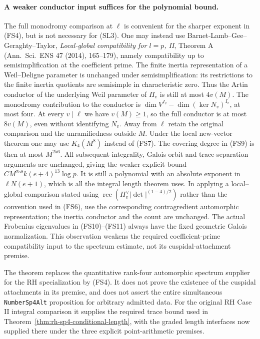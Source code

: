 \paragraph{A weaker conductor input suffices for the polynomial bound.}
The full monodromy comparison at \(\ell\) is convenient for the
sharper exponent in (FS4), but is not necessary for (SL3).
One may instead use Barnet-Lamb--Gee--Geraghty--Taylor,
\emph{Local-global compatibility for \(l=p\), II},
Theorem A (Ann.\ Sci.\ ENS 47 (2014), 165--179), namely
compatibility up to semisimplification at the coefficient prime.
The finite inertia representation of a Weil--Deligne parameter is
unchanged under semisimplification: its restrictions to the finite
inertia quotients are semisimple in characteristic zero.
Thus the Artin conductor of the underlying Weil parameter of
\(\Pi_v\) is still at most \(4v(M)\).
The monodromy contribution to the conductor is
\(\dim V^{I_v}-\dim(\ker N_v)^{I_v}\), at most four.
At every \(v\mid\ell\) we have \(v(M)\ge1\), so the full conductor
is at most \(8v(M)\), even without identifying \(N_v\).
Away from \(\ell\) retain the original comparison and the
unramifiedness outside \(M\). Under the local new-vector theorem
one may use \(K_4(M^8)\) instead of (FS7). The covering degree
in (FS9) is then at most \(M^{256}\). All subsequent integrality,
Galois orbit and trace-separation arguments are unchanged, giving
the weaker explicit bound \(C M^{258}k(e+4)^{13}\log p\).
It is still a polynomial with an absolute exponent in
\(\ell N(e+1)\), which is all the integral length theorem uses.
In applying a local--global comparison stated using
\(\operatorname{rec}(\Pi_v^\vee|\det|^{(1-4)/2})\) rather than
the convention used in (FS6), use the corresponding
contragredient automorphic representation; the inertia conductor
and the count are unchanged. The actual Frobenius eigenvalues
in (FS10)--(FS11) always have the fixed geometric Galois
normalization. This observation weakens the required
coefficient-prime compatibility input to the spectrum estimate,
not its cuspidal-attachment premise.

The theorem replaces the quantitative rank-four automorphic
spectrum supplier for the RH specialization by (FS4). It does
not prove the existence of the cuspidal attachments in its
premise, and does not assert the entire simultaneous
\texttt{NumberSp4Alt} proposition for arbitrary admitted data.
For the original RH Case II integral comparison it supplies
the required trace bound used in
Theorem~\ref{thm:rh-sp4-conditional-length}, with the graded
length interfaces now supplied there under the three explicit
point-arithmetic premises.
